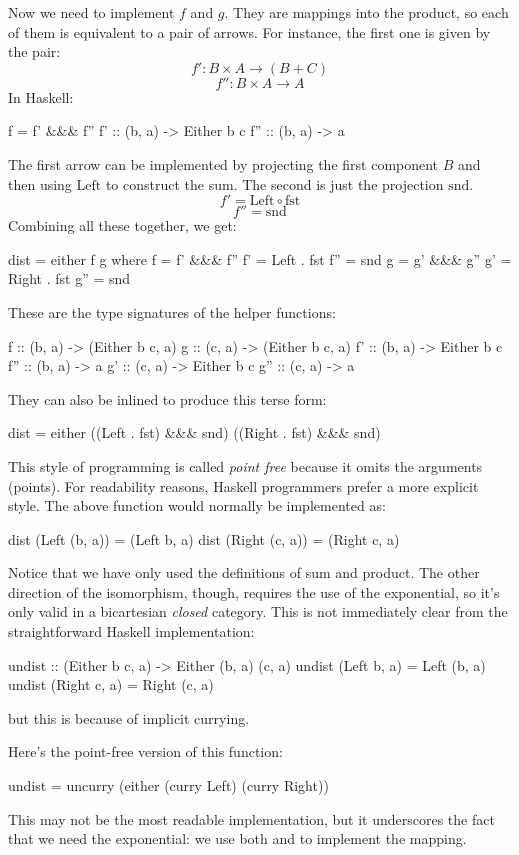 \documentclass[DaoFP]{subfiles}
\begin{document}
Now we need to implement $f$ and $g$. They are mappings into the product, so each of them is equivalent to a pair of arrows. For instance, the first one is given by the pair:
\[f' \colon B \times A \to (B + C)\]
\[f'' \colon B \times A \to  A\]
In Haskell:
\begin{haskell}
    f = f' &&& f''
    f'  :: (b, a) -> Either b c
    f'' :: (b, a) -> a
\end{haskell}
The first arrow can be implemented by projecting the first component $B$ and then using $\text{Left}$ to construct the sum. The second is just the projection $\text{snd}$.
\[ f' = \text{Left} \circ \text{fst} \]
\[ f'' = \text{snd} \]
Combining all these together, we get:
\begin{haskell}
dist = either f g
  where
    f   = f' &&& f''
    f'  = Left . fst
    f'' = snd
    g   = g' &&& g''
    g'  = Right . fst
    g'' = snd
\end{haskell}
These are the type signatures of the helper functions:
\begin{haskell}
    f   :: (b, a) -> (Either b c, a)
    g   :: (c, a) -> (Either b c, a)
    f'  :: (b, a) -> Either b c
    f'' :: (b, a) -> a
    g'  :: (c, a) -> Either b c
    g'' :: (c, a) -> a
\end{haskell}
They can also be inlined to produce this terse form:
\begin{haskell}
dist = either ((Left . fst) &&& snd) ((Right . fst) &&& snd)
\end{haskell}
This style of programming is called \emph{point free} because it omits the arguments (points). For readability reasons, Haskell programmers prefer a more explicit style. The above function would normally be implemented as:
\begin{haskell}
dist (Left  (b, a)) = (Left b, a)
dist (Right (c, a)) = (Right c, a)
\end{haskell}

Notice that we have only used the definitions of sum and product. The other direction of the isomorphism, though, requires the use of the exponential, so it's only valid in a bicartesian \emph{closed} category. This is not immediately clear from the straightforward Haskell implementation:
\begin{haskell}
undist :: (Either b c, a) -> Either (b, a) (c, a)
undist (Left b, a)  = Left (b, a)
undist (Right c, a) = Right (c, a)
\end{haskell}
but this is because of implicit currying. 

Here's the point-free version of this function:
\begin{haskell}
undist = uncurry (either (curry Left) (curry Right))
\end{haskell}
This may not be the most readable implementation, but it underscores the fact that we need the exponential: we use both  and  to implement the mapping.
\end{document}
